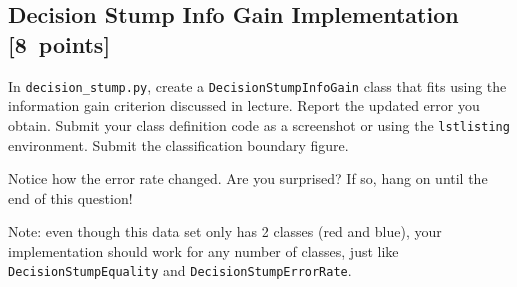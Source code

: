 \documentclass{article}
\newcommand{\blu}[1]{{\textcolor{blu}{#1}}}
\let\ask\blu
\newcommand\pts[1]{\textcolor{pointscolour}{[#1~points]}}
\begin{document}
  \subsection{Decision Stump Info Gain Implementation \pts{8}}

  In \texttt{decision\string_stump.py}, \ask{create a \texttt{DecisionStumpInfoGain} class that
  fits using the information gain criterion discussed in lecture.
  Report the updated error you obtain.
  Submit your class definition code as a screenshot or using the \texttt{lstlisting} environment.
  Submit the classification boundary figure.}

  Notice how the error rate changed. Are you surprised? If so, hang on until the end of this question!

  Note: even though this data set only has 2 classes (red and blue), your implementation should work
  for any number of classes, just like \texttt{DecisionStumpEquality} and \texttt{DecisionStumpErrorRate}.
\end{document}
